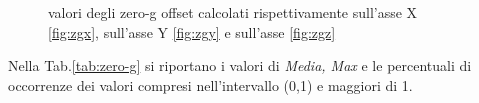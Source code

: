 \begin{figure}[H]
	\centering    
	\label{fig:andamentizero-g}
	\caption{valori degli zero-g offset calcolati rispettivamente sull'asse X \ref{fig:zgx}, sull'asse Y  \ref{fig:zgy} e sull'asse \ref{fig:zgz}}
\end{figure}

Nella Tab.\ref{tab:zero-g} si riportano i valori di \textit{Media, Max} e le percentuali di occorrenze dei valori compresi nell'intervallo (0,1) e maggiori di 1.

